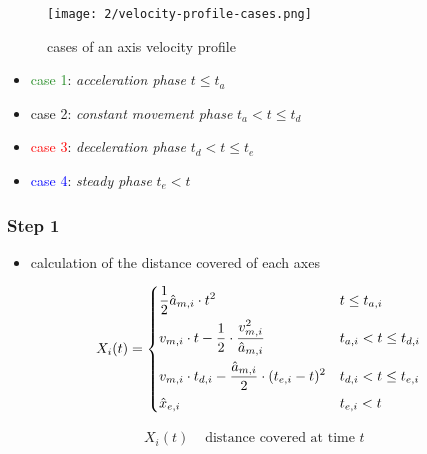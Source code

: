 \documentclass[%
  professionalfonts,%
  xcolor={%
    usenames,%
    dvipsnames,%
    svgnames,%
    table,%
    hyperref%
  }%
]{beamer}
\begin{document}

\begin{frame}
  \begin{figure}[h]
    \texttt{[image: 2/velocity-profile-cases.png]}
    \caption{cases of an axis velocity profile}
    \label{fig:ti-movement-cases}
  \end{figure}
  
  \begin{itemize}
    \item \textcolor{ForestGreen}{case 1}: \emph{acceleration phase} $t \leq t_{a}$
    \item \textcolor{Dandelion}{case 2}: \emph{constant movement phase} $t_{a} < t \leq t_{d}$
    \item \textcolor{red}{case 3}: \emph{deceleration phase} $t_{d} < t \leq t_{e}$
    \item \textcolor{blue}{case 4}: \emph{steady phase} $t_{e} < t$
  \end{itemize}
\end{frame}

\subsubsection{Step 1}
\begin{frame}
\begin{itemize}
  \item calculation of the distance covered of each axes
\end{itemize}
\begin{equation*}
X_{i}(t) = 
\begin{dcases}
\frac{1}{2} \hat{a}_{m,i} \cdot t^2  & t \leq t_{a,i} \\
v_{m,i} \cdot t - \frac{1}{2} \cdot \frac{v_{m,i}^2}{\hat{a}_{m,i}} & t_{a,i} < t \leq t_{d,i} \\
v_{m,i} \cdot t_{d,i} - \frac{\hat{a}_{m,i}}{2} \cdot (t_{e,i} - t)^2 & t_{d,i} < t \leq t_{e,i}\\
\hat{x}_{e,i} & t_{e,i} < t\\
\end{dcases}
\end{equation*}

\begin{align*}
X_{i}(t) & \text{ distance covered at time $t$ } \\
\end{align*}
\end{frame}
\end{document}
